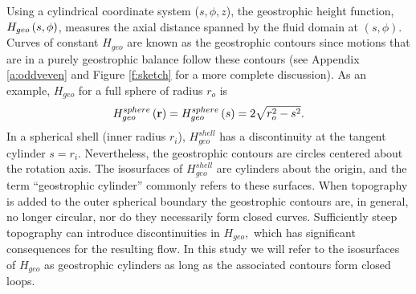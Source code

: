 Using a cylindrical coordinate system ($s,\phi, z$), the geostrophic height function, $H_{geo}\left ( s , \phi \right )$, measures the axial distance spanned by the fluid domain at $(s,\phi)$.  
Curves of constant $H_{geo}$ are known as the geostrophic contours since motions that are in a purely geostrophic balance follow these contours \citep{hG68} (see Appendix \ref{a:oddveven} and Figure \ref{f:sketch} for a more complete discussion). 
As an example, $H_{geo}$ for a full sphere of radius $r_{o}$ is
\[H_{geo}^{s phere}\left ( \mathbf{r}\right ) =  H_{geo}^{s phere}\left ( s\right ) = 2\sqrt{r_{o}^{2} - s^{2}}.\]
In a spherical shell (inner radius $r_{i}$), $H_{geo}^{shell}$ has a discontinuity at the tangent cylinder $s = r_i$. 
Nevertheless, the geostrophic contours are circles centered about the rotation axis.
The isosurfaces of $H_{geo}^{shell}$ are cylinders about the origin, and the term ``geostrophic cylinder'' commonly refers to these surfaces.
When topography is added to the outer spherical boundary the geostrophic contours are, in general, no longer circular, nor do they necessarily form closed curves. Sufficiently steep topography can introduce discontinuities in $H_{geo},$ which has significant consequences for the resulting flow. 
In this study we will refer to the isosurfaces of $H_{geo}$ as geostrophic cylinders as long as the associated contours form closed loops.

